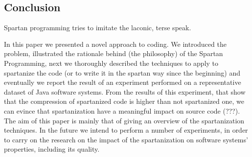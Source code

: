 \subsection{Conclusion}
Spartan programming tries to imitate the laconic, terse speak.  
\label{Conclusion}

In this paper we presented a novel approach to coding. We introduced the
problem, illustrated the rationale behind (the philosophy) of the Spartan
Programming, next we thoroughly described the techniques to apply to spartanize
the code (or to write it in the spartan way since the beginning) and eventually
we report the result of an experiment performed on a representative dataset of
Java software systems.  From the results of this experiment, that show that the
compression of spartanized code is higher than not spartanized one, we can
evince that spartanization have a meaningful impact on source code (???).  The
aim of this paper is mainly that of giving an overview of the spartanization
techniques.  In the future we intend to perform a number of experiments, in
order to carry on the research on the impact of the spartanization on software
systems' properties, including its quality.
